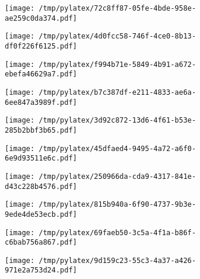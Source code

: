 \documentclass{article}
\begin{document}
\begin{figure}[htbp]
\begin{subfigure}[b]{.3\linewidth}
\texttt{[image: /tmp/pylatex/72c8ff87-05fe-4bde-958e-ae259c0da374.pdf]}
\end{subfigure}
\begin{subfigure}[b]{.3\linewidth}
\texttt{[image: /tmp/pylatex/4d0fcc58-746f-4ce0-8b13-df0f226f6125.pdf]}
\end{subfigure}
\begin{subfigure}[b]{.3\linewidth}
\texttt{[image: /tmp/pylatex/f994b71e-5849-4b91-a672-ebefa46629a7.pdf]}
\end{subfigure}
\begin{subfigure}[b]{.3\linewidth}
\texttt{[image: /tmp/pylatex/b7c387df-e211-4833-ae6a-6ee847a3989f.pdf]}
\end{subfigure}
\begin{subfigure}[b]{.3\linewidth}
\texttt{[image: /tmp/pylatex/3d92c872-13d6-4f61-b53e-285b2bbf3b65.pdf]}
\end{subfigure}
\begin{subfigure}[b]{.3\linewidth}
\texttt{[image: /tmp/pylatex/45dfaed4-9495-4a72-a6f0-6e9d93511e6c.pdf]}
\end{subfigure}
\begin{subfigure}[b]{.3\linewidth}
\texttt{[image: /tmp/pylatex/250966da-cda9-4317-841e-d43c228b4576.pdf]}
\end{subfigure}
\begin{subfigure}[b]{.3\linewidth}
\texttt{[image: /tmp/pylatex/815b940a-6f90-4737-9b3e-9ede4de53ecb.pdf]}
\end{subfigure}
\begin{subfigure}[b]{.3\linewidth}
\texttt{[image: /tmp/pylatex/69faeb50-3c5a-4f1a-b86f-c6bab756a867.pdf]}
\end{subfigure}
\begin{subfigure}[b]{.3\linewidth}
\texttt{[image: /tmp/pylatex/9d159c23-55c3-4a37-a426-971e2a753d24.pdf]}
\end{subfigure}
\end{figure}
\end{document}
